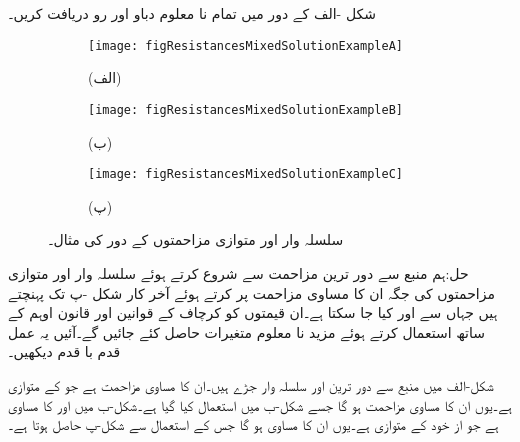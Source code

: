 شکل -الف کے دور میں تمام نا معلوم دباو اور رو دریافت کریں۔
\begin{figure}
\centering
\begin{subfigure}{\textwidth}
\centering
\texttt{[image: figResistancesMixedSolutionExampleA]}
\caption*{(الف)}
\end{subfigure}
%
\begin{subfigure}{0.6\textwidth}
\centering
\texttt{[image: figResistancesMixedSolutionExampleB]}
\caption*{(ب)}
\end{subfigure}%
\begin{subfigure}{0.4\textwidth}
\centering
\texttt{[image: figResistancesMixedSolutionExampleC]}
\caption*{(پ)}
\end{subfigure}%
\caption{سلسلہ وار اور متوازی مزاحمتوں کے دور کی مثال۔}
\label{شکل_مزاحمتی_سلسلہ_وار_متوازی_دور_حل_مثال_الف}
\end{figure}

حل:ہم منبع سے دور ترین مزاحمت سے شروع کرتے ہوئے  سلسلہ وار اور متوازی مزاحمتوں کی جگہ ان کا مساوی مزاحمت پر کرتے ہوئے آخر کار شکل -پ تک پہنچتے ہیں جہاں سے  اور  کیا جا سکتا ہے۔ان قیمتوں کو کرچاف کے قوانین اور قانون اوہم کے ساتھ استعمال کرتے ہوئے مزید نا معلوم متغیرات حاصل کئے جائیں گے۔آئیں یہ عمل قدم با قدم دیکھیں۔ 

شکل-الف میں منبع سے دور ترین  اور  سلسلہ وار جڑے ہیں۔ان کا مساوی
 مزاحمت  ہے جو  کے متوازی ہے۔یوں ان کا مساوی مزاحمت  ہو گا جسے شکل-ب میں استعمال کیا گیا ہے۔شکل-ب میں  اور  کا مساوی  ہے جو از خود  کے متوازی ہے۔یوں ان کا مساوی  ہو گا جس کے استعمال سے شکل-پ حاصل ہوتا ہے۔

